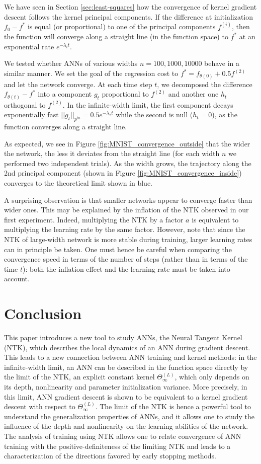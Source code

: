We have seen in Section \ref{sec:least-squares} how the convergence of kernel gradient descent follows the kernel principal components. If the difference at initialization $f_0 - f^*$ is equal (or proportional) to one of the principal components $f^{(i)}$, then the function will converge along a straight line (in the function space) to $f^*$ at an exponential rate $e^{-\lambda_i t}$.

We tested whether ANNs of various widths $n=100, 1000, 10000$ behave in a similar manner. We set the goal of the regression cost to $f^* = f_{\theta(0)}+0.5 f^{(2)}$ and let the network converge. At each time step $t$, we decomposed the difference $f_{\theta(t)} - f^*$ into a component $g_t$ proportional to $f^{(2)}$ and another one $h_t$ orthogonal to $f^{(2)}$. In the infinite-width limit, the first component decays exponentially fast $||g_t||_{p^{in}} = 0.5 e^{-\lambda_2 t}$ while the second is null ($h_t=0$), as the function converges along a straight line.

As expected, we see in Figure \ref{fig:MNIST_convergence_outside} that the wider the network, the less it deviates from the straight line (for each width $n$ we performed two independent trials). As the width grows, the trajectory along the 2nd principal component (shown in Figure \ref{fig:MNIST_convergence_inside}) converges to the theoretical limit shown in blue.

A surprising observation is that smaller networks appear to converge faster than wider ones. This may be explained by the inflation of the NTK observed in our first experiment. Indeed, multiplying the NTK by a factor $a$ is equivalent to multiplying the learning rate by the same factor. However, note that since the NTK of large-width network is more stable during training, larger learning rates can in principle be taken. One must hence be careful when comparing the convergence speed in terms of the number of steps (rather than in terms of the time $t$): both the inflation effect and the learning rate must be taken into account.

\section{Conclusion}
This paper introduces a new tool to study ANNs, the Neural Tangent Kernel (NTK), which describes the local dynamics of an ANN during gradient descent. This leads to a new connection between ANN training and kernel methods: in the infinite-width limit, an ANN can be described in the function space directly by the limit of the NTK, an explicit constant kernel $\Theta^{(L)}_\infty$, which only depends on its depth, nonlinearity and parameter initialization variance. More precisely, in this limit, ANN gradient descent is shown to be equivalent to a kernel gradient descent with respect to $\Theta^{(L)}_\infty$. The limit of the NTK is hence a powerful tool to understand the generalization properties of ANNs, and it allows one to study the influence of the depth and nonlinearity on the learning abilities of the network. The analysis of training using NTK allows one to relate convergence of ANN training with the positive-definiteness of the limiting NTK and leads to a characterization of the directions favored by early stopping methods.


